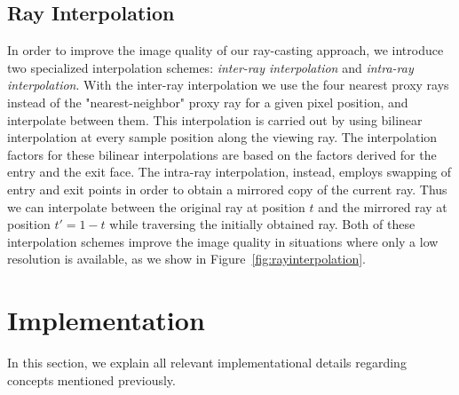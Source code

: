 \documentclass[journal]{vgtc}                %
\begin{document}
\subsection{Ray Interpolation}
In order to improve the image quality of our ray-casting approach, we introduce two specialized interpolation schemes: \emph{inter-ray interpolation} and \emph{intra-ray interpolation}. With the inter-ray interpolation we use the four nearest proxy rays  instead of the "nearest-neighbor" proxy ray for a given pixel position, and interpolate between them. This interpolation is carried out by using bilinear interpolation at every sample position along the viewing ray. The interpolation factors for these bilinear interpolations are based on the factors derived for the entry and the exit face. The intra-ray interpolation, instead, employs swapping of entry and exit points in order to obtain a mirrored copy of the current ray. Thus we can interpolate between the original ray at position $t$ and the mirrored ray at position $t'=1-t$ while traversing the initially obtained ray. Both of these interpolation schemes improve the image quality in situations where only a low resolution is available, as we show in Figure~\ref{fig:rayinterpolation}.
%
%
%
\section{Implementation}\label{sec:implementation}\label{subsec:limitations}
In this section, we explain all relevant implementational details regarding concepts  mentioned previously.
\end{document}
